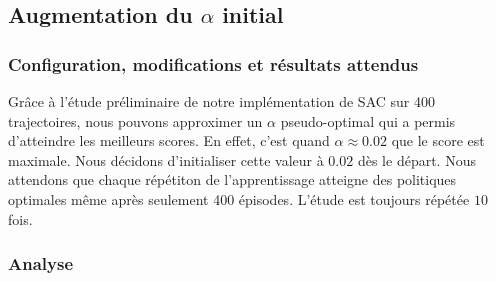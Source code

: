 \subsection{Augmentation du \texorpdfstring{\(\alpha\)}{a} initial}

\subsubsection{Configuration, modifications et résultats attendus}

Grâce à l'étude préliminaire de notre implémentation de SAC sur 400
trajectoires, nous pouvons approximer un $\alpha$ pseudo-optimal qui a permis
d'atteindre les meilleurs scores. En effet, c'est quand $\alpha \approx 0.02$
que le score est maximale. Nous décidons d'initialiser cette valeur à $0.02$ dès
le départ. Nous attendons que chaque répétiton de l'apprentissage atteigne des
politiques optimales même après seulement 400 épisodes. L'étude est toujours répétée $10$ fois.

\subsubsection{Analyse}

